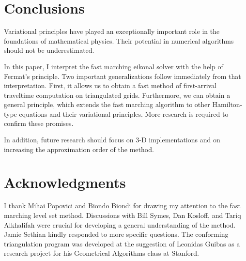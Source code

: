 \section{Conclusions}

Variational principles have played an exceptionally important role in
the foundations of mathematical physics. Their potential in numerical
algorithms should not be underestimated.
\par
In this paper, I interpret the fast marching eikonal solver with the
help of Fermat's principle. Two important generalizations follow
immediately from that interpretation. First, it allows us to obtain a
fast method of first-arrival traveltime computation on triangulated
grids.  Furthermore, we can obtain a general principle, which extends
the fast marching algorithm to other Hamilton-type equations and their
variational principles. More research is required to confirm these
promises. 
\par
In addition, future research should focus on 3-D implementations and
on increasing the approximation order of the method.

\section{Acknowledgments}
I thank Mihai Popovici and Biondo Biondi for drawing my attention to
the fast marching level set method. Discussions with Bill Symes, Dan
Kosloff, and Tariq Alkhalifah were crucial for developing a general
understanding of the method. Jamie Sethian kindly responded to more
specific questions. The conforming triangulation program was developed
at the suggestion of Leonidas Guibas as a research project for his
Geometrical Algorithms class at Stanford.





\newpage



